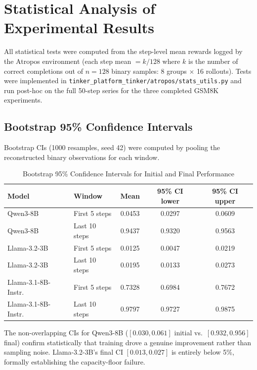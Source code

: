 \documentclass[12pt,a4paper]{report}
\theoremstyle{definition}
\begin{document}
\section{Statistical Analysis of Experimental Results}
\label{sec:statistical_analysis}

All statistical tests were computed from the step-level mean rewards logged by the Atropos environment (each step mean $= k/128$ where $k$ is the number of correct completions out of $n{=}128$ binary samples: 8 groups $\times$ 16 rollouts).  Tests were implemented in \texttt{tinker\_platform_tinker/atropos/stats\_utils.py} and run post-hoc on the full 50-step series for the three completed GSM8K experiments.

\subsection{Bootstrap 95\% Confidence Intervals}

Bootstrap CIs (1000 resamples, seed 42) were computed by pooling the reconstructed binary observations for each window.

\begin{table}[htbp]
\centering
\caption{Bootstrap 95\% Confidence Intervals for Initial and Final Performance}
\label{tab:bootstrap_ci}
\begin{tabular}{llccc}
\toprule
\textbf{Model} & \textbf{Window} & \textbf{Mean} & \textbf{95\% CI lower} & \textbf{95\% CI upper} \\
\midrule
Qwen3-8B           & First 5 steps   & 0.0453 & 0.0297 & 0.0609 \\
Qwen3-8B           & Last 10 steps   & 0.9437 & 0.9320 & 0.9563 \\
\addlinespace
Llama-3.2-3B       & First 5 steps   & 0.0125 & 0.0047 & 0.0219 \\
Llama-3.2-3B       & Last 10 steps   & 0.0195 & 0.0133 & 0.0273 \\
\addlinespace
Llama-3.1-8B-Instr.& First 5 steps   & 0.7328 & 0.6984 & 0.7672 \\
Llama-3.1-8B-Instr.& Last 10 steps   & 0.9797 & 0.9727 & 0.9875 \\
\bottomrule
\end{tabular}
\end{table}

The non-overlapping CIs for Qwen3-8B ($[0.030, 0.061]$ initial vs.\ $[0.932, 0.956]$ final) confirm statistically that training drove a genuine improvement rather than sampling noise.  Llama-3.2-3B's final CI $[0.013, 0.027]$ is entirely below 5\%, formally establishing the capacity-floor failure.
\end{document}
